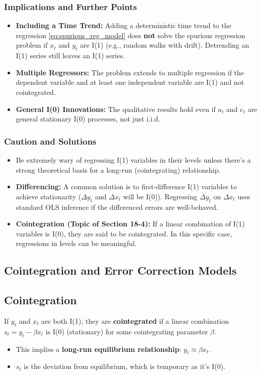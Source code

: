 \documentclass[a4paper, 10pt]{article}
\theoremstyle{definition}	%
\begin{document}
\subsubsection{Implications and Further Points}
\begin{itemize}
    \item \textbf{Including a Time Trend:} Adding a deterministic time trend to the regression \eqref{eq:spurious_reg_model} does \textbf{not} solve the spurious regression problem if \(x_t\) and \(y_t\) are I(1) (e.g., random walks with drift). Detrending an I(1) series still leaves an I(1) series.
    \item \textbf{Multiple Regressors:} The problem extends to multiple regression if the dependent variable and at least one independent variable are I(1) and not cointegrated.
    \item \textbf{General I(0) Innovations:} The qualitative results hold even if \(a_t\) and \(e_t\) are general stationary I(0) processes, not just i.i.d.
\end{itemize}

\subsubsection{Caution and Solutions}
\begin{itemize}
    \item Be extremely wary of regressing I(1) variables in their levels unless there's a strong theoretical basis for a long-run (cointegrating) relationship.
    \item \textbf{Differencing:} A common solution is to first-difference I(1) variables to achieve stationarity (\(\Delta y_t\) and \(\Delta x_t\) will be I(0)). Regressing \(\Delta y_t\) on \(\Delta x_t\) uses standard OLS inference if the differenced errors are well-behaved.
    \item \textbf{Cointegration (Topic of Section 18-4):} If a linear combination of I(1) variables is I(0), they are said to be cointegrated. In this specific case, regressions in levels can be meaningful.
\end{itemize}

\subsection{Cointegration and Error Correction Models}

\subsection{Cointegration}
If \(y_t\) and \(x_t\) are both I(1), they are \textbf{cointegrated} if a linear combination \(s_t = y_t - \beta x_t\) is I(0) (stationary) for some cointegrating parameter \(\beta\).
\begin{itemize}
    \item This implies a \textbf{long-run equilibrium relationship}: \(y_t \approx \beta x_t\).
    \item \(s_t\) is the deviation from equilibrium, which is temporary as it's I(0).
\end{itemize}
\end{document}
